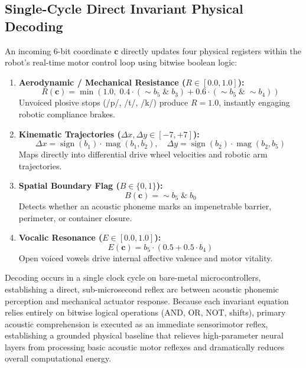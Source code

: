 \documentclass[journal,twocolumn]{IEEEtran}
\begin{document}
\subsection{Single-Cycle Direct Invariant Physical Decoding}
An incoming 6-bit coordinate $\mathbf{c}$ directly updates four physical registers within the robot's real-time motor control loop using bitwise boolean logic:

\begin{enumerate}
    \item \textbf{Aerodynamic / Mechanical Resistance ($R \in [0.0, 1.0]$):}
    \begin{equation}
    R(\mathbf{c}) = \min\left(1.0,\; 0.4 \cdot (\sim b_5 \;\&\; b_3) + 0.6 \cdot (\sim b_5 \;\&\; \sim b_4)\right)
    \end{equation}
    Unvoiced plosive stops (/p/, /t/, /k/) produce $R = 1.0$, instantly engaging robotic compliance brakes.

    \item \textbf{Kinematic Trajectories ($\Delta x, \Delta y \in [-7, +7]$):}
    \begin{equation}
    \Delta x = \operatorname{sign}(b_1) \cdot \operatorname{mag}(b_1, b_2), \quad \Delta y = \operatorname{sign}(b_2) \cdot \operatorname{mag}(b_2, b_5)
    \end{equation}
    Maps directly into differential drive wheel velocities and robotic arm trajectories.

    \item \textbf{Spatial Boundary Flag ($B \in \{0, 1\}$):}
    \begin{equation}
    B(\mathbf{c}) = \sim b_5 \;\&\; b_0
    \end{equation}
    Detects whether an acoustic phoneme marks an impenetrable barrier, perimeter, or container closure.

    \item \textbf{Vocalic Resonance ($E \in [0.0, 1.0]$):}
    \begin{equation}
    E(\mathbf{c}) = b_5 \cdot (0.5 + 0.5 \cdot b_4)
    \end{equation}
    Open voiced vowels drive internal affective valence and motor vitality.
\end{enumerate}

Decoding occurs in a single clock cycle on bare-metal microcontrollers, establishing a direct, sub-microsecond reflex arc between acoustic phonemic perception and mechanical actuator response. Because each invariant equation relies entirely on bitwise logical operations (AND, OR, NOT, shifts), primary acoustic comprehension is executed as an immediate sensorimotor reflex, establishing a grounded physical baseline that relieves high-parameter neural layers from processing basic acoustic motor reflexes and dramatically reduces overall computational energy.
\end{document}
